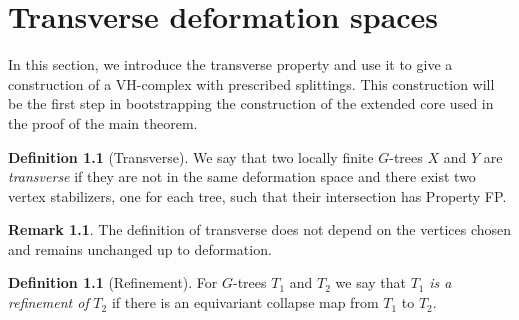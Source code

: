 \documentclass[12pt,parskip=full]{report}
\theoremstyle{plain}
\theoremstyle{definition}
\newtheorem{rmk}[thm]{Remark}
\newtheorem{dfn}[thm]{Definition}
\begin{document}
\chapter{Transverse deformation spaces}

In this section, we introduce the transverse property and use it to give a construction of a VH-complex with prescribed splittings. This construction will be the first step in bootstrapping the construction of the extended core used in the proof of the main theorem.

\begin{dfn}
    [Transverse]
    \label{defn:transverse} 
    We say that two locally finite \(G\)-trees \(X\) and \(Y\) are \emph{transverse} if they are not in the same deformation space and there exist two vertex stabilizers, one for each tree, such that their intersection has Property FP.
\end{dfn}

\begin{rmk}
    The definition of transverse does not depend on the vertices chosen and remains unchanged up to deformation. 
\end{rmk}

\begin{dfn}
    [Refinement]
    For \(G\)-trees \(T_1\) and \(T_2\) we say that \(T_1\) \emph{is a refinement of} \(T_2\) if there is an equivariant collapse map from \(T_1\) to \(T_2\).
\end{dfn}
\end{document}
